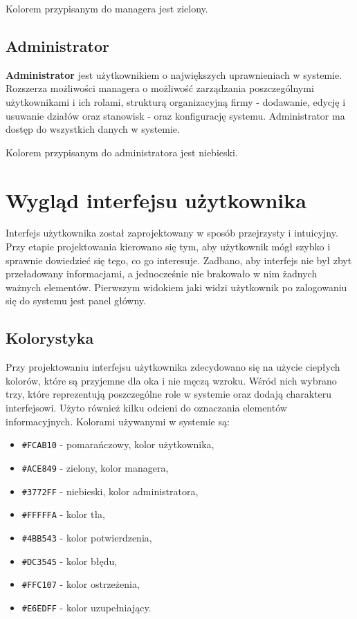Kolorem przypisanym do managera jest zielony.

\subsection{Administrator}

\textbf{Administrator} jest użytkownikiem o największych uprawnieniach w systemie. Rozszerza możliwości managera o możliwość zarządzania poszczególnymi użytkownikami i ich rolami, strukturą organizacyjną firmy - dodawanie, edycję i usuwanie działów oraz stanowisk - oraz konfigurację systemu. Administrator ma dostęp do wszystkich danych w systemie.

Kolorem przypisanym do administratora jest niebieski.

\section{Wygląd interfejsu użytkownika}

Interfejs użytkownika został zaprojektowany w sposób przejrzysty i intuicyjny. Przy etapie projektowania kierowano się tym, aby użytkownik mógł szybko i sprawnie dowiedzieć się tego, co go interesuje. Zadbano, aby interfejs nie był zbyt przeładowany informacjami, a jednocześnie nie brakowało w nim żadnych ważnych elementów. Pierwszym widokiem jaki widzi użytkownik po zalogowaniu się do systemu jest panel główny.

\subsection{Kolorystyka}

Przy projektowaniu interfejsu użytkownika zdecydowano się na użycie ciepłych kolorów, które są przyjemne dla oka i nie męczą wzroku. Wśród nich wybrano trzy, które reprezentują poszczególne role w systemie oraz dodają charakteru interfejsowi. Użyto również kilku odcieni do oznaczania  elementów informacyjnych. Kolorami używanymi w systemie są:
\begin{itemize}
    \item \texttt{\#FCAB10} - pomarańczowy, kolor użytkownika,
    \item \texttt{\#ACE849} - zielony, kolor managera,
    \item \texttt{\#3772FF} - niebieski, kolor administratora,
    \item \texttt{\#FFFFFA} - kolor tła,
    \item \texttt{\#4BB543} - kolor potwierdzenia,
    \item \texttt{\#DC3545} - kolor błędu,
    \item \texttt{\#FFC107} - kolor ostrzeżenia,
    \item \texttt{\#E6EDFF} - kolor uzupełniający.
\end{itemize}

